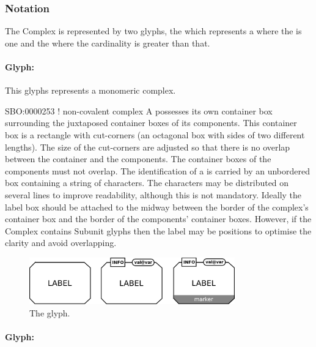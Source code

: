 \subsubsection{Notation}

The Complex is represented by two glyphs, the 
which represents a  where the 
is one and the  where the cardinality is
greater than that.

\paragraph{Glyph: }

This glyphs represents a monomeric complex.

\begin{glyphDescription}
\glyphSboTerm SBO:0000253 ! non-covalent complex
\glyphContainer A  possesses its own container box surrounding the juxtaposed container boxes of its components.  This container box is a rectangle with cut-corners (an octagonal box with sides of two different lengths).  The size of the cut-corners are adjusted so that there is no overlap between the container and the components.  The container boxes of the components must not overlap.
\glyphLabel The identification of a  is carried
by an unbordered box containing a string of characters.  The
characters may be distributed on several lines to improve readability,
although this is not mandatory.  Ideally the label box should be
attached to the midway between the border of the complex's container
box and the border of the components' container boxes. However, if the
Complex contains Subunit glyphs then the label may be positions to
optimise the clarity and avoid overlapping.
\end{glyphDescription}

\begin{figure}[htb]
  \centering
  \includegraphics[width=3.5in]{images/complexGlyph}
  \caption{The  glyph.}
  \label{fig:techref:complex}
\end{figure}

\paragraph{Glyph: }

